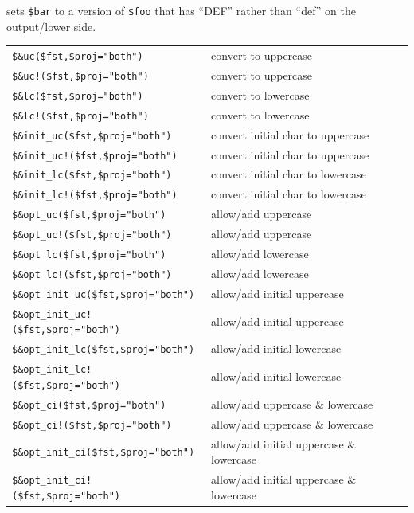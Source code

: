 \documentclass[letterpaper,12pt]{article}
\begin{document}
\noindent
sets \verb!$bar! to a version of \verb!$foo! that has ``DEF'' rather than
``def'' on the output/lower side.

\vspace{0.5cm}

\noindent
\begin{tabular}{|l|l|}
\hline
\verb/$&uc($fst,/\verb!$proj="both"!\verb!)! & convert to uppercase\\
\verb/$&uc!($fst,/\verb!$proj="both"!\verb!)! & convert to uppercase\\
\verb/$&lc($fst,/\verb!$proj="both"!\verb!)! & convert to lowercase\\
\verb/$&lc!($fst,/\verb!$proj="both"!\verb!)! & convert to lowercase\\
\hline
\verb/$&init_uc($fst,/\verb!$proj="both"!\verb!)! & convert initial char to uppercase\\
\verb/$&init_uc!($fst,/\verb!$proj="both"!\verb!)! & convert initial char to uppercase\\
\verb/$&init_lc($fst,/\verb!$proj="both"!\verb!)! & convert initial char to lowercase\\
\verb/$&init_lc!($fst,/\verb!$proj="both"!\verb!)! & convert initial char to lowercase\\
\hline
\verb/$&opt_uc($fst,/\verb!$proj="both"!\verb!)! & allow/add uppercase\\
\verb/$&opt_uc!($fst,/\verb!$proj="both"!\verb!)! & allow/add uppercase\\
\verb/$&opt_lc($fst,/\verb!$proj="both"!\verb!)! & allow/add lowercase\\
\verb/$&opt_lc!($fst,/\verb!$proj="both"!\verb!)! & allow/add lowercase\\
\hline
\verb/$&opt_init_uc($fst,/\verb!$proj="both"!\verb!)! & allow/add initial uppercase\\
\verb/$&opt_init_uc!($fst,/\verb!$proj="both"!\verb!)! & allow/add initial uppercase\\
\verb/$&opt_init_lc($fst,/\verb!$proj="both"!\verb!)! & allow/add initial lowercase\\
\verb/$&opt_init_lc!($fst,/\verb!$proj="both"!\verb!)! & allow/add initial lowercase\\
\hline
\verb/$&opt_ci($fst,/\verb!$proj="both"!\verb!)! & allow/add uppercase \& lowercase\\
\verb/$&opt_ci!($fst,/\verb!$proj="both"!\verb!)! & allow/add uppercase \& lowercase\\
\verb/$&opt_init_ci($fst,/\verb!$proj="both"!\verb!)! & allow/add initial uppercase \& lowercase\\
\verb/$&opt_init_ci!($fst,/\verb!$proj="both"!\verb!)! & allow/add initial uppercase \& lowercase\\
\hline
\end{tabular}
\end{document}
